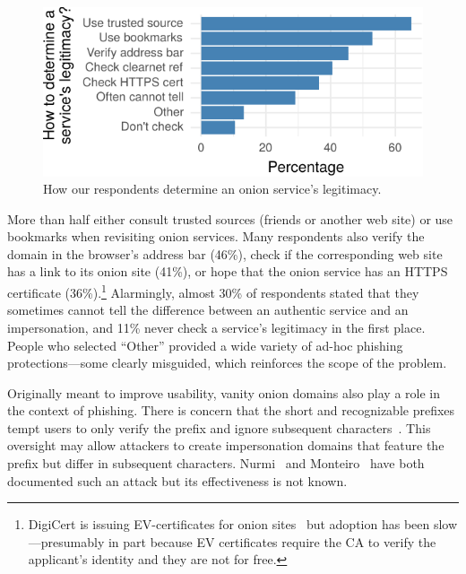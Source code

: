\begin{figure}[t]
    \centering
    \includegraphics[width=\linewidth]{figures/determining-legitimacy.pdf}
    \caption{How our respondents determine an onion service's legitimacy.}
    \label{fig:determining-legitimacy}
\end{figure}

More than half either consult trusted sources (\eg friends or another web site)
or use bookmarks when revisiting onion services.  Many respondents also verify
the domain in the browser's address bar (46\%), check if the corresponding web
site has a link to its onion site (41\%), or hope that the onion service has an
HTTPS certificate (36\%).\footnote{DigiCert is issuing EV-certificates for onion
sites~\cite{DigiCert2015a} but adoption has been slow---presumably in part
because EV certificates require the CA to verify the applicant's identity
and they are not for free.}  Alarmingly, almost 30\% of respondents stated that
they sometimes cannot tell the difference between an authentic service and an
impersonation, and 11\% never check a service's legitimacy in the first place.
People who selected ``Other'' provided a wide variety of ad-hoc phishing
protections---some clearly misguided, which reinforces the scope of the problem.

Originally meant to improve usability, vanity onion domains also play a role in
the context of phishing.  There is concern that the short and recognizable
prefixes tempt users to only verify the prefix and ignore subsequent
characters~\cite{Winter2015a}.  This oversight may allow attackers to create
impersonation domains that feature the prefix but differ in subsequent
characters.  Nurmi~\cite{Nurmi2015a} and Monteiro~\cite{Monteiro2016a} have both
documented such an attack but its effectiveness is not known.

